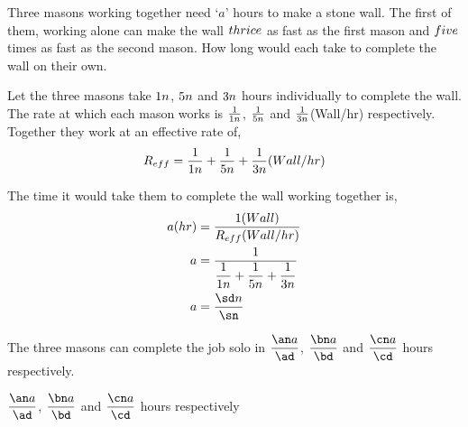 

\vd\tn\td
\FRACADD\tn{}\ve\sn\sd

\vc\sn\sd\an\ad
{}\vd\sn\sd\bn\bd
{}\ve\sn\sd\cn\cd

\question[3] Three masons working together need `$a$' hours to make a stone 
wall. The first of them, working alone can make the wall $thrice$ as fast as the 
first mason and $five$ times as fast as the second mason. How long would each 
take to complete the wall on their own.

\watchout

\begin{solution}[\halfpage]
  Let the three masons take $1 n$, $5 n$ and $3 n$ hours individually to 
  complete the wall. The rate at which each mason works is $\frac{1}{1 n}$, 
  $\frac{1}{5 n}$ and $\frac{1}{3 n}$(Wall/hr) respectively. Together they 
  work at an effective rate of,
  \begin{align}
    R_{eff} = \dfrac{1}{1 n} +\dfrac{1}{5 n} +\dfrac{1}{3 n}(Wall/hr)
  \end{align}
  
  The time it would take them to complete the wall working together is,
  \begin{align}
    a(hr) &= \dfrac{1(Wall)}{R_{eff}(Wall/hr)} \\
    a     &= \dfrac{1}{\dfrac{1}{\vc n} +\dfrac{1}{\vd n} +\dfrac{1}{\ve n}} \\
    a     &= \dfrac{\sd n}{\sn}
  \end{align}
  
  The three masons can complete the job solo in $\dfrac{\an a}{\ad}$, 
  $\dfrac{\bn a}{\bd}$ and $\dfrac{\cn a}{\cd}$ hours respectively.
  
\end{solution}

\ifprintanswers\begin{codex}
  $\dfrac{\an a}{\ad}$, $\dfrac{\bn a}{\bd}$ and $\dfrac{\cn a}{\cd}$ hours 
  respectively
\end{codex}\fi

